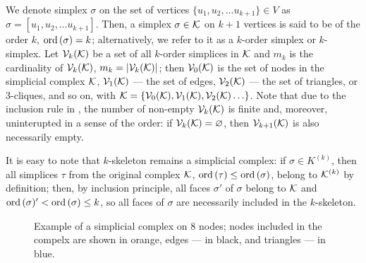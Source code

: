 We denote simplex \( \sigma \) on the set of vertices \( \{ u_1, u_2, \dots u_{k+1} \} \in V  \) as \( \sigma = [u_1, u_2, \dots u_{k+1} ]\). Then, a simplex \( \sigma \in \mathcal{K} \) on \( k + 1 \) vertices is said to be of the order \( k \), \( \mathrm{ord}\,(\sigma) = k \); alternatively, we refer to it as a \(k\)-order simplex or \(k\)-simplex. Let \( \mathcal{V}_{k}(\mathcal{K}) \) be a set of all \(k\)-order simplices in \( \mathcal{K} \) and \( m_k \) is the cardinality of \( \mathcal{V}_{k}(\mathcal{K})\), \( m_k = | \mathcal{V}_{k}(\mathcal{K}) | \); then \( \mathcal{V}_{0}(\mathcal{K}) \) is the set of nodes in the simplicial complex \( \mathcal{K} \), \( \mathcal{V}_{1}(\mathcal{K}) \) --- the set of edges, \( \mathcal{V}_{2}(\mathcal{K}) \) --- the set of triangles, or \(3\)-cliques, and so on, with \( \mathcal{K} = \{ \mathcal{V}_{0}(\mathcal{K}), \mathcal{V}_{1}(\mathcal{K}), \mathcal{V}_{2}(\mathcal{K}) \ldots \} \). Note that due to the inclusion rule in , the number of non-empty \( \mathcal{V}_{k}(\mathcal{K}) \) is finite and, moreover, uninterupted in a sense of the order: if \( \mathcal{V}_{k}(\mathcal{K}) = \varnothing \), then \( \mathcal{V}_{k+1}(\mathcal{K}) \) is also necessarily empty.

It is easy to note that \( k\)-skeleton remains a simplicial complex: if \( \sigma \in K^{(k)}\), then all simplices \( \tau \) from the original complex \( \mathcal{K} \), \( \mathrm{ord}\,(\tau) \le \mathrm{ord}\,(\sigma) \), belong to \( \mathcal{K}^{(k)} \) by definition; then, by inclusion principle, all faces \( \sigma' \) of \( \sigma \) belong to \( \mathcal{K} \) and \( \mathrm{ord}\,(\sigma)' < \mathrm{ord}\,(\sigma) \le k \), so all faces of \( \sigma \) are necessarily included in the \( k\)-skeleton.

\begin{figure}[hbtp]
      \centering
      
      \caption{
            Example of a simplicial complex on \(8\) nodes; nodes included in the compelx are shown in orange, edges --- in black, and triangles  --- in blue.\label{fig:example_SC}}
\end{figure}


